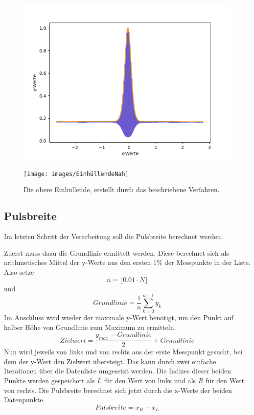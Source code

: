 \begin{figure}[htb]
    \centering
    \begin{minipage}{.5\textwidth}
        \centering
        \includegraphics[width=\linewidth]{images/ObereEinhuellende}
    \end{minipage}%
    \begin{minipage}{.5\textwidth}
        \centering
        \texttt{[image: images/EinhüllendeNah]}
    \end{minipage}
    \caption{Die obere Einhüllende, erstellt durch das beschriebene Verfahren.}
    \label{fig:oberer-einh}
\end{figure}

\subsection{Pulsbreite}\label{subsec:pulsbreite}
Im letzten Schritt der Verarbeitung soll die Pulsbreite berechnet werden.

Zuerst muss dazu die Grundlinie ermittelt werden.
Diese berechnet sich als arithmetisches Mittel der y-Werte aus den ersten 1\% der Messpunkte in der Liste.
Also setze
\[
    n = \lfloor0.01 \cdot N \rfloor
\]
und
\[
    Grundlinie = \frac{1}{n} \sum_{k = 0}^{n - 1} y_k
\]
Im Anschluss wird wieder der maximale y-Wert benötigt, um den Punkt auf halber Höhe von Grundlinie zum Maximum zu ermitteln.
\[
    Zielwert = \frac{y_{max} - Grundlinie}{2} + Grundlinie
\]
Nun wird jeweils von links und von rechts aus der erste Messpunkt gesucht, bei dem der y-Wert den Zielwert übersteigt.
Das kann durch zwei einfache Iterationen über die Datenliste umgesetzt werden.
Die Indizes dieser beiden Punkte werden gespeichert als $L$ für den Wert von links und als $R$ für den Wert von rechts.
Die Pulsbreite berechnet sich jetzt durch die x-Werte der beiden Datenpunkte.
\[
    Pulsbreite = x_R - x_L
\]


